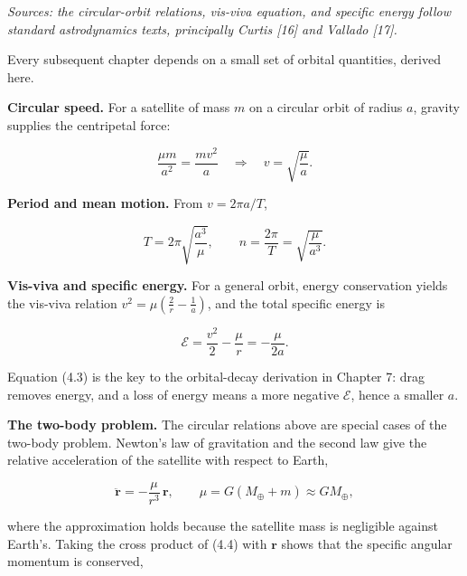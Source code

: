 \documentclass[
  11pt,
  openany,
  oneside]{book}
\begin{document}
\emph{Sources: the circular-orbit relations, vis-viva equation, and
specific energy follow standard astrodynamics texts, principally Curtis
{[}16{]} and Vallado {[}17{]}.}

Every subsequent chapter depends on a small set of orbital quantities,
derived here.

\textbf{Circular speed.} For a satellite of mass \(m\) on a circular
orbit of radius \(a\), gravity supplies the centripetal force:

\begin{equation}
\frac{\mu m}{a^2} = \frac{m v^2}{a} \quad\Longrightarrow\quad v = \sqrt{\frac{\mu}{a}}. \tag{4.1}
\end{equation}

\textbf{Period and mean motion.} From \(v = 2\pi a / T\),

\begin{equation}
T = 2\pi\sqrt{\frac{a^3}{\mu}}, \qquad n = \frac{2\pi}{T} = \sqrt{\frac{\mu}{a^3}}. \tag{4.2}
\end{equation}

\textbf{Vis-viva and specific energy.} For a general orbit, energy
conservation yields the vis-viva relation
\(v^2 = \mu\left(\tfrac{2}{r} - \tfrac{1}{a}\right)\), and the total
specific energy is

\begin{equation}
\mathcal{E} = \frac{v^2}{2} - \frac{\mu}{r} = -\frac{\mu}{2a}. \tag{4.3}
\end{equation}

Equation (4.3) is the key to the orbital-decay derivation in Chapter 7:
drag removes energy, and a loss of energy means a more negative
\(\mathcal{E}\), hence a smaller \(a\).

\textbf{The two-body problem.} The circular relations above are special
cases of the two-body problem. Newton's law of gravitation and the
second law give the relative acceleration of the satellite with respect
to Earth,

\begin{equation}
\ddot{\mathbf r} = -\frac{\mu}{r^{3}}\,\mathbf r, \qquad \mu = G(M_\oplus + m) \approx G M_\oplus, \tag{4.4}
\end{equation}

where the approximation holds because the satellite mass is negligible
against Earth's. Taking the cross product of (4.4) with \(\mathbf r\)
shows that the specific angular momentum is conserved,
\end{document}
